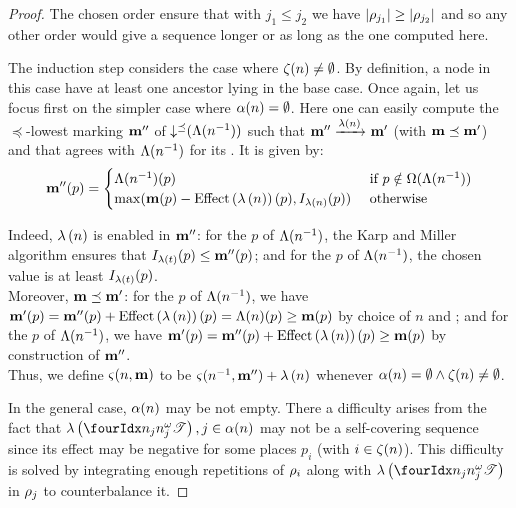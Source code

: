 \begin{proof}
  The chosen order ensure that with $j_1 \leq j_2$ we have $\card{\iscs{j_1}} \geq \card{\iscs{j_2}}$ and so any other order would give a sequence longer or as long as the one computed here.

  The induction step considers the case where $\operatorname{\zeta}(n) \neq \emptyset$.
  By definition, a node in this case have at least one ancestor lying in the base case.
  Once again, let us focus first on the simpler case where $\operatorname{\alpha}(n) = \emptyset$.
  Here one can easily compute the $\preceq$-lowest marking $\mathbf{m}''$ of $\operatorname{\downarrow^\preceq}(\operatorname{\Lambda}(n^{-1}))$ such that $\mathbf{m}'' \xrightarrow{\operatorname{\lambda}\left({n}\right)}_{} \mathbf{m}'$ (with $\mathbf{m} \preceq \mathbf{m}'$)
  and that agrees with $\operatorname{\Lambda}(n^{-1})$ for its \noplaces. It is given by:
  \[
    \mar''(p) = \begin{cases}
      \lab{\parent{n}}(p)
        &\text{ if } p \notin \op{\lab{\parent{n}}} \\
      \max(\mar(p) - \effect{\labt{n}}(p), \inw[\labt{n}][p])
        &\text{ otherwise}
    \end{cases}
  \]

  Indeed, %
  $\operatorname{\lambda}\left({n}\right)$ is enabled in $\mathbf{m}''$:
  for the \noplaces $p$ of $\operatorname{\Lambda}(n^{-1})$, the Karp and Miller algorithm ensures that $I_{\operatorname{\lambda}\left({t}\right)}(p) \leq \mathbf{m}''(p)$;
  and for the \oplaces $p$ of $\operatorname{\Lambda}(n^{-1})$, the chosen value is at least $I_{\operatorname{\lambda}\left({t}\right)}(p)$.\\
  Moreover, %
  $\mathbf{m} \preceq \mathbf{m}'$:
  for the \noplaces $p$ of $\operatorname{\Lambda}(n^{-1})$, we have $\mar'(p) = \mar''(p) + \effect{\labt{n}}(p) = \lab{n}(p) \geq \mar(p)$ by choice of $n$ and \mar;
  and for the \oplaces $p$ of $\operatorname{\Lambda}(n^{-1})$, we have $\mar'(p) = \mar''(p) + \effect{\labt{n}}(p) \geq \mar(p)$ by construction of $\mathbf{m}''$.\\
  Thus, we define
  $\operatorname{\varsigma}(n,\mathbf{m})$ to be $\operatorname{\varsigma}(n^{-1},\mathbf{m}'') + \operatorname{\lambda}\left({n}\right)$
  whenever
  $\operatorname{\alpha}(n) = \emptyset \wedge \operatorname{\zeta}(n) \neq \emptyset$.

  In the general case, $\operatorname{\alpha}(n)$ may be not empty.
  There a difficulty arises from the fact that $\labt{\treepath[n_j]{n^\omega_j}}, j \in \na{n}$ may not be a self-covering sequence since its effect may be negative for some places $p_i$ (with $i \in \operatorname{\zeta}(n)$).
  This difficulty is solved by integrating enough repetitions of $\iscs{i}$ along with $\labt{\treepath[n_j]{n^\omega_j}}$ in $\iscs{j}$ to counterbalance it.


\end{proof}
